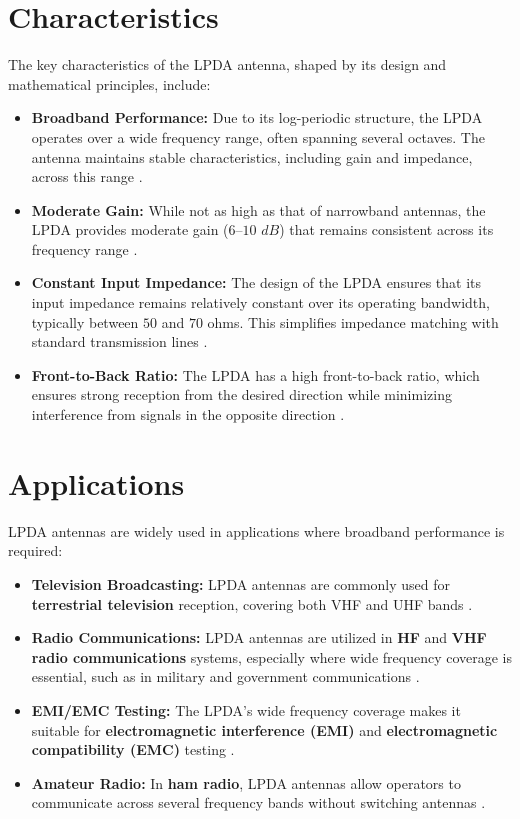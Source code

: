 \documentclass[a4paper, 12pt, english]{article}
\begin{document}
\section{Characteristics}
The key characteristics of the LPDA antenna, shaped by its design and mathematical principles, include:
\begin{itemize}
    \item \textbf{Broadband Performance:} Due to its log-periodic structure, the LPDA operates over a wide frequency range, often spanning several octaves. The antenna maintains stable characteristics, including gain and impedance, across this range \cite{balanis2016antenna} \cite{carrel1966design}.
    \item \textbf{Moderate Gain:} While not as high as that of narrowband antennas, the LPDA provides moderate gain ($ 6 $–$ 10 $ $ dB $) that remains consistent across its frequency range \cite{arrl2014antenna}.
    \item \textbf{Constant Input Impedance:} The design of the LPDA ensures that its input impedance remains relatively constant over its operating bandwidth, typically between $ 50 $ and $ 70 $ ohms. This simplifies impedance matching with standard transmission lines \cite{nakano1996wideband}.
    \item \textbf{Front-to-Back Ratio:} The LPDA has a high front-to-back ratio, which ensures strong reception from the desired direction while minimizing interference from signals in the opposite direction \cite{kraus2002antennas}.
\end{itemize}


\section{Applications}
LPDA antennas are widely used in applications where broadband performance is required:
\begin{itemize}
    \item \textbf{Television Broadcasting:} LPDA antennas are commonly used for \textbf{terrestrial television} reception, covering both VHF and UHF bands \cite{carrel1966design}.
    \item \textbf{Radio Communications:} LPDA antennas are utilized in \textbf{HF} and \textbf{VHF radio communications} systems, especially where wide frequency coverage is essential, such as in military and government communications \cite{balanis2016antenna}.
    \item \textbf{EMI/EMC Testing:} The LPDA’s wide frequency coverage makes it suitable for \textbf{electromagnetic interference (EMI)} and \textbf{electromagnetic compatibility (EMC)} testing \cite{ieee1979test}.
    \item \textbf{Amateur Radio:} In \textbf{ham radio}, LPDA antennas allow operators to communicate across several frequency bands without switching antennas \cite{balanis2016antenna}.
\end{itemize}
\newpage
\end{document}
